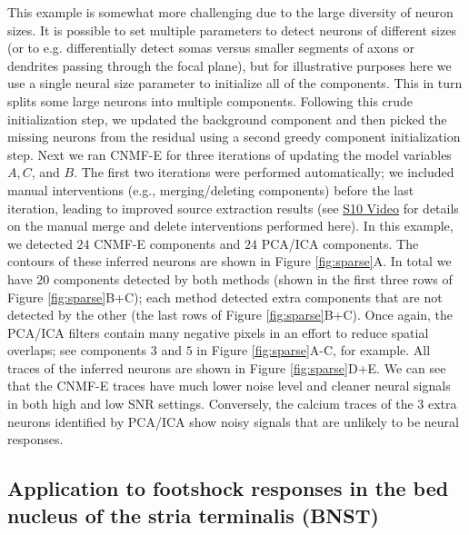 \documentclass[9pt,lineno]{elife}
\begin{document}
This example is somewhat more challenging due to the large diversity of neuron sizes.  It is possible to set multiple parameters to detect neurons of different sizes (or to e.g. differentially detect somas versus smaller segments of axons or dendrites passing through the focal plane), but for illustrative purposes here we use a single neural size parameter to initialize all of the components. This in turn splits some large neurons into multiple components. Following this crude initialization step, we updated the background component and then picked the missing neurons from the residual using a second greedy component initialization step. Next we ran CNMF-E for three iterations of updating the model variables $A, C$, and $B$. The first two iterations were performed automatically; we included manual interventions (e.g., merging/deleting components) before the last iteration, leading to improved source extraction results (see   \href{http://www.columbia.edu/~pz2230/videos/intervention_results.mp4}{S10 Video} for details on the manual merge and delete interventions performed here).  In this example, we detected $24$ CNMF-E components and $24$ PCA/ICA components. The contours of these inferred neurons are shown in Figure \ref{fig:sparse}A. In total we have $20$ components detected by both methods (shown in the first three rows of Figure \ref{fig:sparse}B+C); each method detected extra components that are not detected by the other (the last rows of Figure \ref{fig:sparse}B+C). Once again, the PCA/ICA filters contain many negative pixels in an effort to reduce spatial overlaps; see components $3$ and $5$ in Figure \ref{fig:sparse}A-C, for example. All traces of the inferred neurons are shown in Figure \ref{fig:sparse}D+E. We can see that the CNMF-E traces have much lower noise level and cleaner neural signals in both high and low SNR settings. Conversely, the calcium traces of the 3 extra neurons identified by PCA/ICA show noisy signals that are unlikely to be neural responses. 

\subsection{Application to footshock responses in the bed nucleus of the stria terminalis (BNST)}
\end{document}
